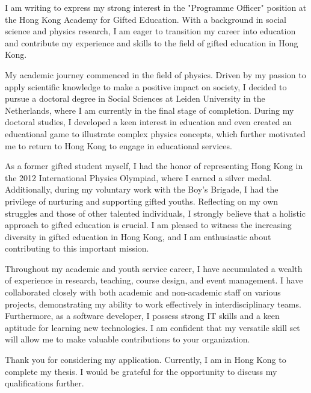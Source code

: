 \documentclass[11pt, a4paper]{awesome-cv}
\begin{document}
\makecvheader[R]

\makecvfooter
  {}%
  {}%
  {}

\makelettertitle

\begin{cvletter}

I am writing to express my strong interest in the "Programme Officer" position at the Hong Kong Academy for Gifted Education. With a background in social science and physics research, I am eager to transition my career into education and contribute my experience and skills to the field of gifted education in Hong Kong.

My academic journey commenced in the field of physics. Driven by my passion to apply scientific knowledge to make a positive impact on society, I decided to pursue a doctoral degree in Social Sciences at Leiden University in the Netherlands, where I am currently in the final stage of completion. During my doctoral studies, I developed a keen interest in education and even created an educational game to illustrate complex physics concepts, which further motivated me to return to Hong Kong to engage in educational services.

As a former gifted student myself, I had the honor of representing Hong Kong in the 2012 International Physics Olympiad, where I earned a silver medal. Additionally, during my voluntary work with the Boy's Brigade, I had the privilege of nurturing and supporting gifted youths. Reflecting on my own struggles and those of other talented individuals, I strongly believe that a holistic approach to gifted education is crucial. I am pleased to witness the increasing diversity in gifted education in Hong Kong, and I am enthusiastic about contributing to this important mission.

Throughout my academic and youth service career, I have accumulated a wealth of experience in research, teaching, course design, and event management. I have collaborated closely with both academic and non-academic staff on various projects, demonstrating my ability to work effectively in interdisciplinary teams. Furthermore, as a software developer, I possess strong IT skills and a keen aptitude for learning new technologies. I am confident that my versatile skill set will allow me to make valuable contributions to your organization.

Thank you for considering my application. Currently, I am in Hong Kong to complete my thesis. I would be grateful for the opportunity to discuss my qualifications further.

\end{cvletter}


\makeletterclosing
\end{document}
